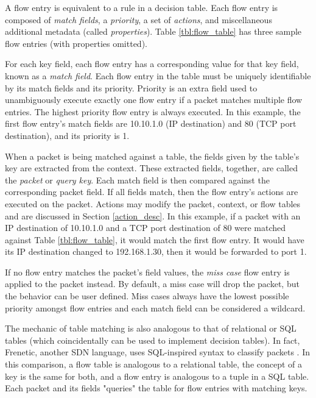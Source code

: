 A flow entry is equivalent to a rule in a decision table. Each flow entry is
composed of \emph{match fields}, a \emph{priority}, a set of
\emph{actions}, and miscellaneous additional metadata (called
\emph{properties}). Table \ref{tbl:flow_table} has three sample flow entries
(with properties omitted).

For each key field, each flow entry has a corresponding value for that
key field, known as a
\emph{match field}. Each flow entry in the table must be uniquely
identifiable by its match fields and its priority.
Priority is an extra field used to
unambiguously execute exactly one flow entry if a packet matches
multiple flow entries.
The highest priority flow entry is always executed.
In this example, the first flow entry's match fields are
10.10.1.0 (IP destination) and 80 (TCP port destination), and its priority is 1.

When a packet is being matched
against a table, the fields given by the table's key are extracted from the
context. These extracted fields, together, are called the \emph{packet} or \emph{query key}.
Each match field is then compared against the corresponding packet field.
If all fields match, then the flow entry's actions are executed on the packet.
Actions may modify the packet, context, or flow tables and are discussed in Section
\ref{action_desc}.
In this example, if a packet with an IP destination of 10.10.1.0 and a TCP port
destination of 80 were matched against Table \ref{tbl:flow_table}, it would
match the first flow entry. It would have its IP destination changed to
192.168.1.30, then it would be forwarded to port 1.

If no flow entry matches the packet's field values, the \emph{miss case} flow
entry is applied to the packet instead. By default, a miss case will drop the
packet, but the behavior can be user defined. Miss cases always have the lowest
possible priority amongst flow entries and each match field can be considered a
wildcard.

The mechanic of table matching is also analogous to that of relational or SQL
tables (which coincidentally can be used to implement decision tables). In fact,
Frenetic, another SDN language, uses SQL-inspired syntax to
classify packets \cite{foster2011frenetic, foster2013frenetic}. In this comparison, a flow table is analogous to a relational table, the concept of a
key is the same for both, and a flow entry is analogous to a tuple in a SQL
table. Each packet and its fields "queries" the table for flow entries with
matching keys.

